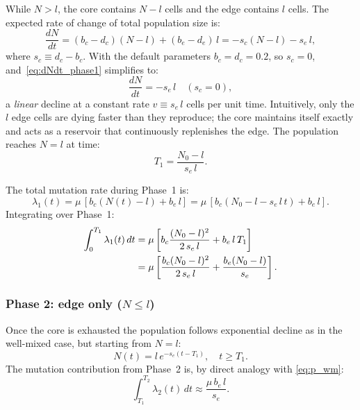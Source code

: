 \documentclass[12pt]{article}
\newcommand{\Nzero}{N_0}
\newcommand{\sEdge}{s_e}
\newcommand{\sCore}{s_c}
\newcommand{\bEdge}{b_e}
\newcommand{\dEdge}{d_e}
\newcommand{\bCore}{b_c}
\newcommand{\dCore}{d_c}
\begin{document}
While $N > l$, the core contains $N - l$ cells and the edge contains $l$
cells. The expected rate of change of total population size is:
\begin{equation}
    \frac{dN}{dt} = (\bCore - \dCore)(N - l) + (\bEdge - \dEdge)\, l
    = -\sCore (N - l) - \sEdge\, l,
    \label{eq:dNdt_phase1}
\end{equation}
where $\sCore \equiv \dCore - \bCore$. With the default parameters
$\bCore = \dCore = 0.2$, so $\sCore = 0$, and~\eqref{eq:dNdt_phase1}
simplifies to:
\begin{equation}
    \frac{dN}{dt} = -\sEdge\, l \quad (\sCore = 0),
    \label{eq:linear_decline}
\end{equation}
a \emph{linear} decline at a constant rate $v \equiv \sEdge\, l$ cells per
unit time. Intuitively, only the $l$ edge cells are dying faster than they
reproduce; the core maintains itself exactly and acts as a reservoir that
continuously replenishes the edge. The population reaches $N = l$ at time:
\begin{equation}
    T_1 = \frac{\Nzero - l}{\sEdge\, l}.
    \label{eq:T1}
\end{equation}

The total mutation rate during Phase~1 is:
\begin{equation}
    \lambda_1(t) = \mu\, [\bCore (N(t) - l) + \bEdge\, l]
    = \mu\, [\bCore (\Nzero - l - \sEdge\, l\, t) + \bEdge\, l].
\end{equation}
Integrating over Phase~1:
\begin{align}
    \int_0^{T_1} \lambda_1(t)\, dt
    &= \mu\left[\bCore \frac{(\Nzero - l)^2}{2\,\sEdge\, l}
       + \bEdge\, l\, T_1\right] \notag \\
    &= \mu\left[\frac{\bCore(\Nzero - l)^2}{2\,\sEdge\, l}
       + \frac{\bEdge(\Nzero - l)}{\sEdge}\right].
    \label{eq:Lambda1}
\end{align}

\subsubsection*{Phase 2: edge only ($N \leq l$)}

Once the core is exhausted the population follows exponential decline as in
the well-mixed case, but starting from $N = l$:
\begin{equation}
    N(t) = l\, e^{-\sEdge(t - T_1)}, \quad t \geq T_1.
\end{equation}
The mutation contribution from Phase~2 is, by direct analogy with
\eqref{eq:p_wm}:
\begin{equation}
    \int_{T_1}^{T_2} \lambda_2(t)\, dt \approx \frac{\mu\, \bEdge\, l}{\sEdge}.
    \label{eq:Lambda2}
\end{equation}
\end{document}
